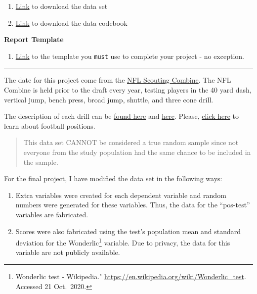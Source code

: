 \documentclass[11pt,]{article}
\providecommand{\tightlist}{%
  \setlength{\itemsep}{0pt}\setlength{\parskip}{0pt}}
\begin{document}
\begin{enumerate}
\def\labelenumi{\arabic{enumi}.}
\tightlist
\item
  \href{https://osf.io/bf58v/}{Link} to download the data set
\item
  \href{https://osf.io/sg46v/}{Link} to download the data codebook
\end{enumerate}

\textbf{Report Template}

\begin{enumerate}
\def\labelenumi{\arabic{enumi}.}
\tightlist
\item
  \href{final-project-template.docx}{Link} to the template you
  \texttt{must} use to complete your project - no exception.
\end{enumerate}

\begin{center}\rule{0.5\linewidth}{0.5pt}\end{center}

The date for this project come from the
\href{https://en.wikipedia.org/wiki/NFL_Scouting_Combine}{NFL Scouting
Combine}. The NFL Combine is held prior to the draft every year, testing
players in the 40 yard dash, vertical jump, bench press, broad jump,
shuttle, and three cone drill.

The description of each drill can be
\href{https://nflcombineresults.com/nfl-combine-drills-101-what-each-drill-measures/}{found
here} and
\href{https://www.espn.com/nfl/draft2018/story/_/id/22587931/guide-nfl-draft-combine-drills-todd-mcshay-numbers-know-40-yard-dash-short-shuttle-bench-press}{here}.
Please,
\href{https://protips.dickssportinggoods.com/sports-and-activities/football/football-101-football-positions-and-their-roles}{click
here} to learn about football positions.

\begin{quote}
This data set CANNOT be considered a true random sample since not
everyone from the study population had the same chance to be included in
the sample.
\end{quote}

For the final project, I have modified the data set in the following
ways:

\begin{enumerate}
\def\labelenumi{\arabic{enumi}.}
\item
  Extra variables were created for each dependent variable and random
  numbers were generated for these variables. Thus, the data for the
  ``pos-test'' variables are fabricated.
\item
  Scores were also fabricated using the test's population mean and
  standard deviation for the Wonderlic\footnote{Wonderlic test -
    Wikipedia." \url{https://en.wikipedia.org/wiki/Wonderlic_test}.
    Accessed 21 Oct.~2020.} variable. Due to privacy, the data for this
  variable are not publicly available.
\end{enumerate}
\end{document}
